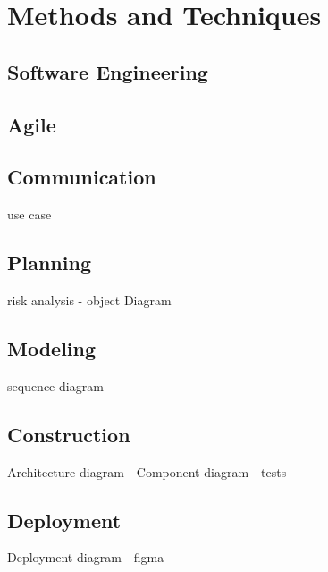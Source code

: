 

\chapter{Methods and Techniques} %

\label{ch:methodsandtechniques} %


\section{Software Engineering}
\section{Agile}
\section{Communication}
use case
\section{Planning}
risk analysis - object Diagram
\section{Modeling}
sequence diagram
\section{Construction}
Architecture diagram - Component diagram - tests
\section{Deployment}
Deployment diagram - figma